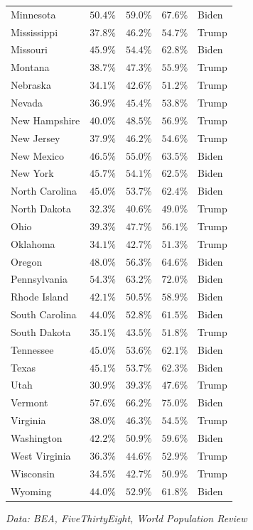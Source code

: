 \documentclass[
]{article}
\begin{document}
\begin{longtable}{lrrrl}
Minnesota & $50.4\%$ & $59.0\%$ & $67.6\%$ & Biden \\ 
Mississippi & $37.8\%$ & $46.2\%$ & $54.7\%$ & Trump \\ 
Missouri & $45.9\%$ & $54.4\%$ & $62.8\%$ & Biden \\ 
Montana & $38.7\%$ & $47.3\%$ & $55.9\%$ & Trump \\ 
Nebraska & $34.1\%$ & $42.6\%$ & $51.2\%$ & Trump \\ 
Nevada & $36.9\%$ & $45.4\%$ & $53.8\%$ & Trump \\ 
New Hampshire & $40.0\%$ & $48.5\%$ & $56.9\%$ & Trump \\ 
New Jersey & $37.9\%$ & $46.2\%$ & $54.6\%$ & Trump \\ 
New Mexico & $46.5\%$ & $55.0\%$ & $63.5\%$ & Biden \\ 
New York & $45.7\%$ & $54.1\%$ & $62.5\%$ & Biden \\ 
North Carolina & $45.0\%$ & $53.7\%$ & $62.4\%$ & Biden \\ 
North Dakota & $32.3\%$ & $40.6\%$ & $49.0\%$ & Trump \\ 
Ohio & $39.3\%$ & $47.7\%$ & $56.1\%$ & Trump \\ 
Oklahoma & $34.1\%$ & $42.7\%$ & $51.3\%$ & Trump \\ 
Oregon & $48.0\%$ & $56.3\%$ & $64.6\%$ & Biden \\ 
Pennsylvania & $54.3\%$ & $63.2\%$ & $72.0\%$ & Biden \\ 
Rhode Island & $42.1\%$ & $50.5\%$ & $58.9\%$ & Biden \\ 
South Carolina & $44.0\%$ & $52.8\%$ & $61.5\%$ & Biden \\ 
South Dakota & $35.1\%$ & $43.5\%$ & $51.8\%$ & Trump \\ 
Tennessee & $45.0\%$ & $53.6\%$ & $62.1\%$ & Biden \\ 
Texas & $45.1\%$ & $53.7\%$ & $62.3\%$ & Biden \\ 
Utah & $30.9\%$ & $39.3\%$ & $47.6\%$ & Trump \\ 
Vermont & $57.6\%$ & $66.2\%$ & $75.0\%$ & Biden \\ 
Virginia & $38.0\%$ & $46.3\%$ & $54.5\%$ & Trump \\ 
Washington & $42.2\%$ & $50.9\%$ & $59.6\%$ & Biden \\ 
West Virginia & $36.3\%$ & $44.6\%$ & $52.9\%$ & Trump \\ 
Wisconsin & $34.5\%$ & $42.7\%$ & $50.9\%$ & Trump \\ 
Wyoming & $44.0\%$ & $52.9\%$ & $61.8\%$ & Biden \\ 
\bottomrule
\end{longtable}
\begin{minipage}{\linewidth}
\emph{Data: BEA, FiveThirtyEight, World Population Review}\\ 
\end{minipage}
\end{document}
